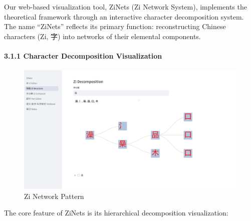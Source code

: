 \documentclass[
  11pt,
  letterpaper,
]{article}
\begin{document}
Our web-based visualization tool, ZiNets (Zi Network System), implements
the theoretical framework through an interactive character decomposition
system. The name ``ZiNets'' reflects its primary function:
reconstructing Chinese characters (Zi, 字) into networks of their
elemental components.

\hypertarget{character-decomposition-visualization}{%
\paragraph{3.1.1 Character Decomposition
Visualization}\label{character-decomposition-visualization}}

\begin{figure}
\centering
\includegraphics{./images/app_decomposing-zi.png}
\caption{Zi Network Pattern}
\end{figure}

The core feature of ZiNets is its hierarchical decomposition
visualization:
\end{document}
